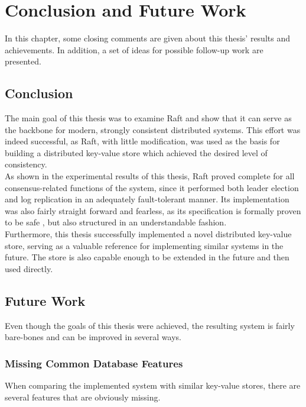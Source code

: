 \chapter{Conclusion and Future Work}

In this chapter, some closing comments are given about this thesis' results and achievements. In addition, a set of ideas for possible follow-up work are presented.

\section{Conclusion}

The main goal of this thesis was to examine Raft and show that it can serve as the backbone for modern, strongly consistent distributed systems. This effort was indeed successful, as Raft, with little modification, was used as the basis for building a distributed key-value store which achieved the desired level of consistency.\\

As shown in the experimental results of this thesis, Raft proved complete for all consensus-related functions of the system, since it performed both leader election and log replication in an adequately fault-tolerant manner. Its implementation was also fairly straight forward and fearless, as its specification is formally proven to be safe \cite{raft}, but also structured in an understandable fashion.\\

Furthermore, this thesis successfully implemented a novel distributed key-value store, serving as a valuable reference for implementing similar systems in the future. The store is also capable enough to be extended in the future and then used directly.

\section{Future Work}

Even though the goals of this thesis were achieved, the resulting system is fairly bare-bones and can be improved in several ways.

\subsection{Missing Common Database Features}

When comparing the implemented system with similar key-value stores, there are several features that are obviously missing.\\

